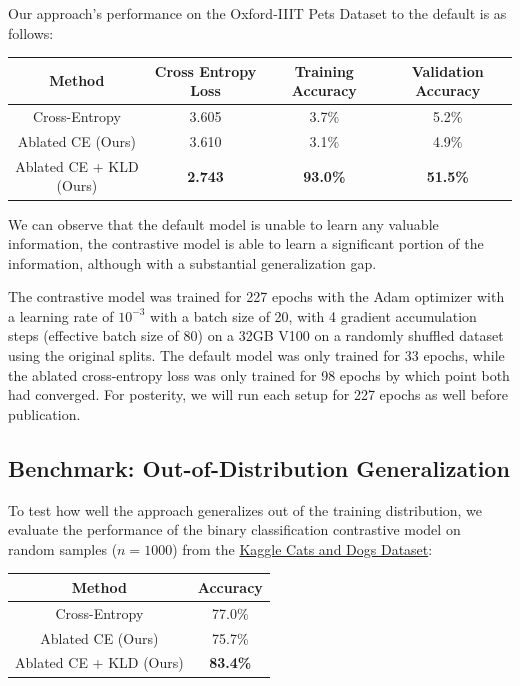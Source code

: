 \documentclass{article}
\begin{document}
Our approach's performance on the Oxford-IIIT Pets Dataset to the default is as follows:

\begin{table}[h]
	\centering
	\begin{tabular}{c|ccc}
		\toprule
		\textbf{Method}  & \textbf{Cross Entropy Loss}  & \textbf{Training Accuracy}   & \textbf{Validation Accuracy} \\
		\midrule
		Cross-Entropy & 3.605 & 3.7\% & 5.2\% \\
		Ablated CE (Ours) & 3.610 & 3.1\% & 4.9\% \\
		Ablated CE + KLD (Ours) & \bf 2.743 & \bf 93.0\% & \bf 51.5\% \\
		\bottomrule
	\end{tabular}
\end{table}

We can observe that the default model is unable to learn any valuable information, the contrastive model is able to learn a significant portion of the information, although with a substantial generalization gap.

The contrastive model was trained for 227 epochs with the Adam optimizer with a learning rate of $10^{-3}$ with a batch size of 20, with 4 gradient accumulation steps (effective batch size of 80) on a 32GB V100 on a randomly shuffled dataset using the original splits. The default model was only trained for 33 epochs, while the ablated cross-entropy loss was only trained for 98 epochs by which point both had converged. For posterity, we will run each setup for 227 epochs as well before publication.

\subsection{Benchmark: Out-of-Distribution Generalization}

To test how well the approach generalizes out of the training distribution, we evaluate the performance of the binary classification contrastive model on random samples ($n=1000$) from the \href{https://www.microsoft.com/en-us/download/details.aspx?id=54765}{Kaggle Cats and Dogs Dataset}:
\begin{table}[h]
	\centering
	\begin{tabular}{c|c}
		\toprule
		\textbf{Method} & \textbf{Accuracy} \\
		\midrule
		Cross-Entropy & 77.0\% \\
		Ablated CE (Ours) & 75.7\% \\
		Ablated CE + KLD (Ours) & \bf 83.4\% \\
		\bottomrule
	\end{tabular}
\end{table}
\end{document}
